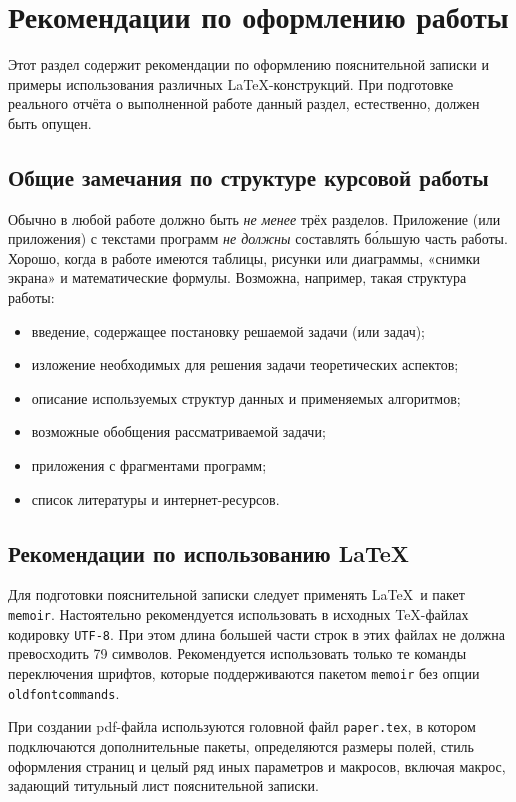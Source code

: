 \section{Рекомендации по оформлению работы}

Этот раздел содержит рекомендации по оформлению пояснительной записки
и примеры использования различных \LaTeX-конструкций. При подготовке
реального отчёта о выполненной работе данный раздел, естественно, должен
быть опущен.

\subsection*{Общие замечания по структуре курсовой работы}

Обычно в любой работе должно быть \emph{не менее} трёх разделов. Приложение
(или приложения) с текстами программ \emph{не должны} составлять б\'{о}льшую
часть работы. Хорошо, когда в работе имеются таблицы, рисунки или диаграммы,
«снимки экрана» и математические формулы. Возможна, например, такая 
структура работы:

\begin{itemize}
\item введение, содержащее постановку решаемой задачи (или задач);
\item изложение необходимых для решения задачи теоретических аспектов;
\item описание используемых структур данных и применяемых алгоритмов;
\item возможные обобщения рассматриваемой задачи;
\item приложения с фрагментами программ;
\item список литературы и интернет-ресурсов.
\end{itemize}

\subsection*{Рекомендации по использованию \LaTeX}

Для подготовки пояснительной записки следует применять \LaTeX\ и пакет 
\texttt{memoir}. Настоятельно рекомендуется использовать в исходных 
\TeX-файлах кодировку \texttt{UTF-8}. При этом длина большей части строк в 
этих файлах не должна превосходить 79 символов. Рекомендуется 
использовать только те команды переключения шрифтов, которые поддерживаются
пакетом \verb|memoir| без опции \verb|oldfontcommands|. 

При создании pdf-файла используются головной файл \texttt{paper.tex},
в котором подключаются дополнительные 
пакеты, определяются размеры полей, стиль оформления страниц и целый ряд иных 
параметров и макросов, включая макрос, задающий титульный лист пояснительной
записки.

